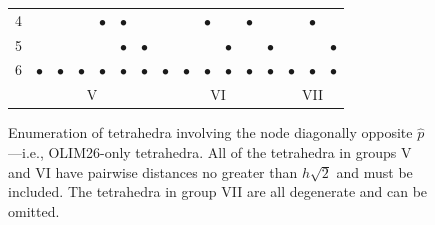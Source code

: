 \documentclass[eikonal.tex]{subfiles}
\begin{document}
\begin{figure}[t]
\begin{tabular}{c|cccccc|cccccc|ccc}
    4 & & & & $\bullet$ & $\bullet$ & & & & $\bullet$ & & $\bullet$ & & & $\bullet$ & \\
    5 & & & & & $\bullet$ & $\bullet$ & & & & $\bullet$ & & $\bullet$ & & & $\bullet$ \\
    6 & $\bullet$ & $\bullet$ & $\bullet$ & $\bullet$ & $\bullet$ & $\bullet$ & $\bullet$ & $\bullet$ & $\bullet$ & $\bullet$ & $\bullet$ & $\bullet$ & $\bullet$ & $\bullet$ & $\bullet$ \\
    \multicolumn{1}{c}{} & \multicolumn{6}{c}{V} & \multicolumn{6}{c}{VI} & \multicolumn{3}{c}{VII}
  \end{tabular}
  \caption{Enumeration of tetrahedra involving the node diagonally
    opposite $\hat{p}$---i.e., OLIM26-only tetrahedra. All of the
    tetrahedra in groups V and VI have pairwise distances no greater
    than $h \sqrt{2}$ and must be included. The tetrahedra in group
    VII are all degenerate and can be
    omitted.}\label{fig:olim26-tetrahedra}
  \vspace{1em}
\end{figure}
\end{document}
